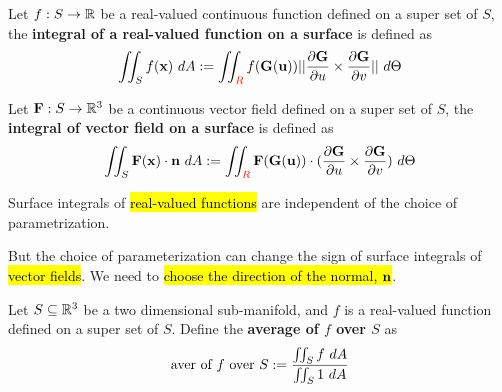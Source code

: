 \documentclass[11pt]{article}
\begin{document}
				\begin{definition}
					Let $f: S \to \mathbb{R}$ be a real-valued continuous function defined on a super set of $S$, the \textbf{integral of a real-valued function on a surface} is defined as
					\begin{equation}
						\iint_{S}f(\ve{x})\ dA 
						:= \iint_{\red{R}} f(\ve{G}(\ve{u}))\norm{\pd{\ve{G}}{u} \times \pd{\ve{G}}{v}}\ d\Theta
					\end{equation}
				\end{definition}
				
				\begin{definition}
					Let $\textbf{F}: S \to \mathbb{R}^3$ be a continuous vector field defined on a super set of $S$, the \textbf{integral of vector field on a surface} is defined as
					\begin{equation}
						\iint_{S}\textbf{F}(\textbf{x}) \cdot \textbf{n}\ dA
						:= \iint_{\textcolor{red}{R}} \textbf{F}(\textbf{G}(\textbf{u}))\cdot (\frac{\partial{\textbf{G}}}{\partial{u}} \times \frac{\partial{\textbf{G}}}{\partial{v}})\ d\Theta
					\end{equation} 
				\end{definition}
				
				\begin{remark}
					Surface integrals of \hl{real-valued functions} are independent of the choice of parametrization.
				\end{remark}
				
				\begin{remark}
					But the choice of parameterization can change the sign of surface integrals of \hl{vector fields}. We need to \hl{choose the direction of the normal, $\textbf{n}$}.
				\end{remark}
				
				\begin{definition}
					Let $S \subseteq \mathbb{R}^3$ be a two dimensional sub-manifold, and $f$ is a real-valued function defined on a super set of $S$. Define the \textbf{average of $f$ over $S$} as
					\begin{equation}
						\text{{aver of $f$ over $S$}} := \frac{\iint_S f\ dA}{\iint_S1\ dA}
					\end{equation}
				\end{definition}
				
\end{document}
